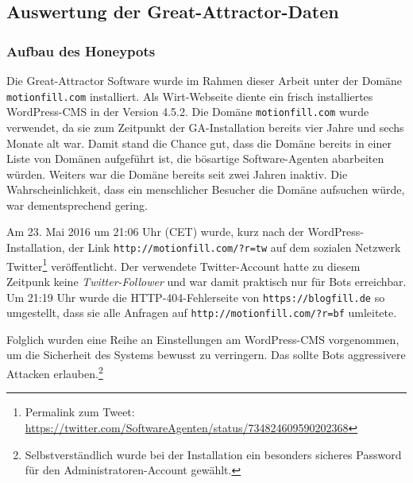 \subsection{Auswertung der Great-Attractor-Daten}
\label{sub:auswertung-der-great-attractor-daten}

\subsubsection{Aufbau des Honeypots}
\label{ssub:aufbau-des-honeypots}

Die Great-Attractor Software wurde im Rahmen dieser Arbeit unter der Domäne
\texttt{motionfill.com} installiert. Als Wirt-Webseite diente ein frisch
installiertes WordPress-CMS in der Version 4.5.2. Die Domäne
\texttt{motionfill.com} wurde verwendet, da sie zum Zeitpunkt der
GA-Installation bereits vier Jahre und sechs Monate alt war. Damit stand die
Chance gut, dass die Domäne bereits in einer Liste von Domänen aufgeführt ist,
die bösartige Software-Agenten abarbeiten würden. Weiters war die Domäne
bereits seit zwei Jahren inaktiv. Die Wahrscheinlichkeit, dass ein
menschlicher Besucher die Domäne aufsuchen würde, war dementsprechend gering.

Am 23. Mai 2016 um 21:06 Uhr (CET) wurde, kurz nach der WordPress-Installation,
der Link \texttt{http://motionfill.com/?r=tw} auf dem sozialen Netzwerk
Twitter\footnote{Permalink zum Tweet:
\url{https://twitter.com/SoftwareAgenten/status/734824609590202368}}
veröffentlicht. Der verwendete Twitter-Account hatte zu diesem Zeitpunk keine
\emph{Twitter-Follower} und war damit praktisch nur für Bots erreichbar. Um
21:19 Uhr wurde die HTTP-404-Fehlerseite von \texttt{https://blogfill.de} so
umgestellt, dass sie alle Anfragen auf \texttt{http://motionfill.com/?r=bf}
umleitete.

Folglich wurden eine Reihe an Einstellungen am WordPress-CMS vorgenommen, um
die Sicherheit des Systems bewusst zu verringern. Das sollte Bots aggressivere
Attacken erlauben.\footnote{Selbstverständlich wurde bei der Installation ein
besonders sicheres Password für den Administratoren-Account gewählt.}

